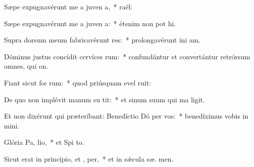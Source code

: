 \item Sæpe expugnavérunt me a juven a,~*   raël:
\item Sæpe expugnavérunt me a juven a:~* étenim non pot hi.
\item Supra dorsum meum fabricavérunt res:~* prolongavérunt ini am.
\item Dóminus justus concídit cervíces rum:~* confundántur et convertántur retrórsum omnes, qui  on.
\item Fiant sicut fœ rum:~* quod priúsquam evel ruit:
\item De quo non implévit manum su  tit:~* et sinum suum qui ma ligit.
\item Et non dixérunt qui præteríbant: Benedíctio Dó per vos:~* benedíximus vobis in  mini.
\item Glória Pa,  lio,~* et Spi to.
\item Sicut erat in princípio, et ,  per,~* et in sǽcula sæ. men.
